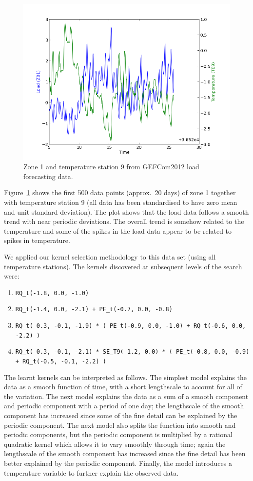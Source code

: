 \documentclass[twoside]{article}
\begin{document}
\begin{figure}
\includegraphics[width=0.5\columnwidth]{../figures/gef_load_z01_t09_500}
\caption{Zone 1 and temperature station 9 from GEFCom2012 load forecasting data.}
\label{fig:gef_z01_t09}
\end{figure}

Figure~\ref{fig:gef_z01_t09} shows the first 500 data points (approx.~20 days) of zone 1 together with temperature station 9 (all data has been standardised to have zero mean and unit standard deviation).
The plot shows that the load data follows a smooth trend with near periodic deviations.
The overall trend is somehow related to the temperature and some of the spikes in the load data appear to be related to spikes in temperature.

We applied our kernel selection methodology to this data set (using all temperature stations).
The kernels discovered at subsequent levels of the search were:
\begin{enumerate}
\item \texttt{RQ\_t(-1.8,  0.0, -1.0)}
\item \texttt{RQ\_t(-1.4,  0.0, -2.1) + PE\_t(-0.7,  0.0, -0.8)}
\item \texttt{RQ\_t( 0.3, -0.1, -1.9) * ( PE\_t(-0.9,  0.0, -1.0) + RQ\_t(-0.6,  0.0, -2.2) )}
\item \texttt{RQ\_t( 0.3, -0.1, -2.1) * SE\_T9( 1.2,  0.0) * ( PE\_t(-0.8,  0.0, -0.9) + RQ\_t(-0.5, -0.1, -2.2) )}
\end{enumerate}
The learnt kernels can be interpreted as follows.
The simplest model explains the data as a smooth function of time, with a short lengthscale to account for all of the variation.
The next model explains the data as a sum of a smooth component and periodic component with a period of one day; the lengthscale of the smooth component has increased since some of the fine detail can be explained by the periodic component.
The next model also splits the function into smooth and periodic components, but the periodic component is multiplied by a rational quadratic kernel which allows it to vary smoothly through time; again the lengthscale of the smooth component has increased since the fine detail has been better explained by the periodic component.
Finally, the model introduces a temperature variable to further explain the observed data.
\end{document}
